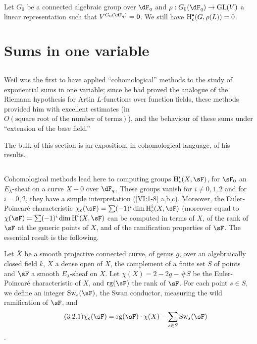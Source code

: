 Let $G_0$ be a connected algebraic group over $\dF_q$ and
$\rho:G_0(\dF_q) \to \operatorname{GL}(V)$ a linear representation
such that $V^{G_0(\dF_q)}=0$. We still have $\h_c^\bullet(G,\rho(L))=0$. 










\section{Sums in one variable}\label{VI:3}





\subsection{}\label{VI:3-1}

Weil was the first to have applied ``cohomological'' methods to
the study of exponential sums in one variable; since he had
proved the analogue of the Riemann hypothesis for Artin $L$-functions
over function fields, these methods provided him with excellent
estimates (in $O(\text{square root of the number of terms})$), and the
behaviour of these sums under ``extension of the base field.''

The bulk of this section is an exposition, in cohomological language, of
his results. 





\subsection{}\label{VI:3-2}

Cohomological methods lead here to computing groups
$\h_c^i(X,\sF)$, for $\sF_0$ an $E_\lambda$-sheaf on a curve $X-0$ over
$\dF_q$. These groups vanish for $i\ne 0,1,2$ and for
$i=0,2$, they have a simple interpretation (\ref{VI:1-8} a,b,c). Moreover, the
Euler-Poincaré characteristic
$\chi_c(\sF) = \sum (-1)^i \dim \h_c^i(X,\sF)$ (moreover equal to
$\chi(\sF) = \sum (-1)^i \dim \h^i(X,\sF)$ can be computed in terms of
$X$, of the rank of $\sF$ at the generic points of $X$, and of the
ramification properties of $\sF$. The essential result is the following.

Let $\bar X$ be a smooth projective connected curve, of genus $g$, over an
algebraically closed field $k$, $X$ a dense open of $\bar X$,
the complement of a finite set $S$ of points and $\sF$ a
smooth $E_\lambda$-sheaf on $X$. Let $\chi(X)=2-2 g-\# S$ be the
Euler-Poincaré characteristic of $X$, and $\operatorname{rg}(\sF)$ the
rank of $\sF$. For each point $s\in S$, we define an integer
$\swan_s(\sF)$, the Swan conductor, measuring the wild ramification of
$\sF$, and 
\begin{align*}\tag{3.2.1}\label{VI:eq:3-2-1}
  \chi_c(\sF) = \operatorname{rg}(\sF) \cdot \chi(X) - \sum_{s\in S} \swan_s(\sF) 
\end{align*}
\cite{ra65}. 





